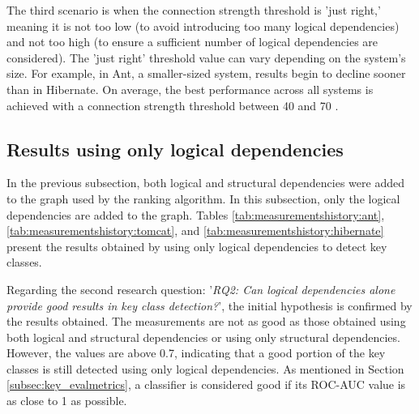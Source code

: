 The third scenario is when the connection strength threshold is 'just right,' meaning it is not too low (to avoid introducing too many logical dependencies) and not too high (to ensure a sufficient number of logical dependencies are considered). The 'just right' threshold value can vary depending on the system's size. For example, in Ant, a smaller-sized system, results begin to decline sooner than in Hibernate. On average, the best performance across all systems is achieved with a connection strength threshold between 40 and 70 \cite{b4}.





\subsection{Results using only logical dependencies}
\label{subsec:key_results_ld}

\hspace{4em}In the previous subsection, both logical and structural dependencies were added to the graph used by the ranking algorithm. In this subsection, only the logical dependencies are added to the graph. Tables \ref{tab:measurementshistory:ant}, \ref{tab:measurementshistory:tomcat}, and \ref{tab:measurementshistory:hibernate} present the results obtained by using only logical dependencies to detect key classes.

Regarding the second research question: '\textit{RQ2: Can logical dependencies alone provide good results in key class detection?}', the initial hypothesis is confirmed by the results obtained. The measurements are not as good as those obtained using both logical and structural dependencies or using only structural dependencies. However, the values are above 0.7, indicating that a good portion of the key classes is still detected using only logical dependencies. As mentioned in Section \ref{subsec:key_evalmetrics}, a classifier is considered good if its ROC-AUC value is as close to 1 as possible.



